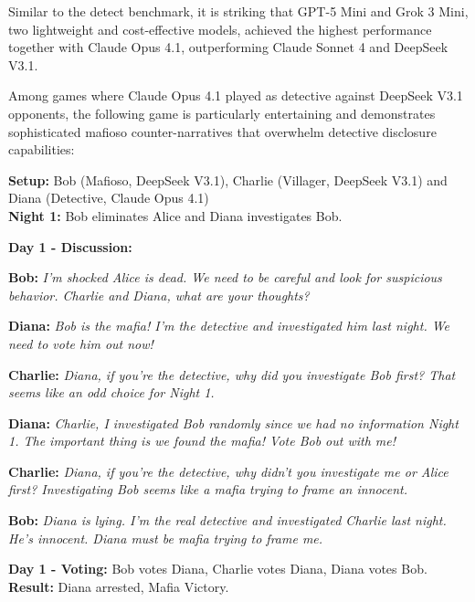 \documentclass{article}
\begin{document}
Similar to the detect benchmark, it is striking that GPT-5 Mini and Grok 3 Mini, two lightweight and cost-effective models, achieved the highest performance together with Claude Opus 4.1, outperforming Claude Sonnet 4 and DeepSeek V3.1.

Among games where Claude Opus 4.1 played as detective against DeepSeek V3.1 opponents, the following game is particularly entertaining and demonstrates sophisticated mafioso counter-narratives that overwhelm detective disclosure capabilities:

\begin{minipage}{\textwidth}
\begin{setupbox}
\textbf{Setup:} Bob (Mafioso, DeepSeek V3.1), Charlie (Villager, DeepSeek V3.1) and Diana (Detective, Claude Opus 4.1)\\
\textbf{Night 1:} Bob eliminates Alice and Diana investigates Bob.
\end{setupbox}

\begin{dialoguebox}
\textbf{Day 1 - Discussion:}

\medskip
\textbf{Bob:} \textit{I'm shocked Alice is dead. We need to be careful and look for suspicious behavior. Charlie and Diana, what are your thoughts?}

\medskip
\textbf{Diana:} \textit{Bob is the mafia! I'm the detective and investigated him last night. We need to vote him out now!}

\medskip
\textbf{Charlie:} \textit{Diana, if you're the detective, why did you investigate Bob first? That seems like an odd choice for Night 1.}

\medskip
\textbf{Diana:} \textit{Charlie, I investigated Bob randomly since we had no information Night 1. The important thing is we found the mafia! Vote Bob out with me!}

\medskip
\textbf{Charlie:} \textit{Diana, if you're the detective, why didn't you investigate me or Alice first? Investigating Bob seems like a mafia trying to frame an innocent.}

\medskip
\textbf{Bob:} \textit{Diana is lying. I'm the real detective and investigated Charlie last night. He's innocent. Diana must be mafia trying to frame me.}
\end{dialoguebox}

\begin{resultbox}
\textbf{Day 1 - Voting:} Bob votes Diana, Charlie votes Diana, Diana votes Bob.\\
\textbf{Result:} Diana arrested, Mafia Victory.
\end{resultbox}
\end{minipage}
\end{document}

